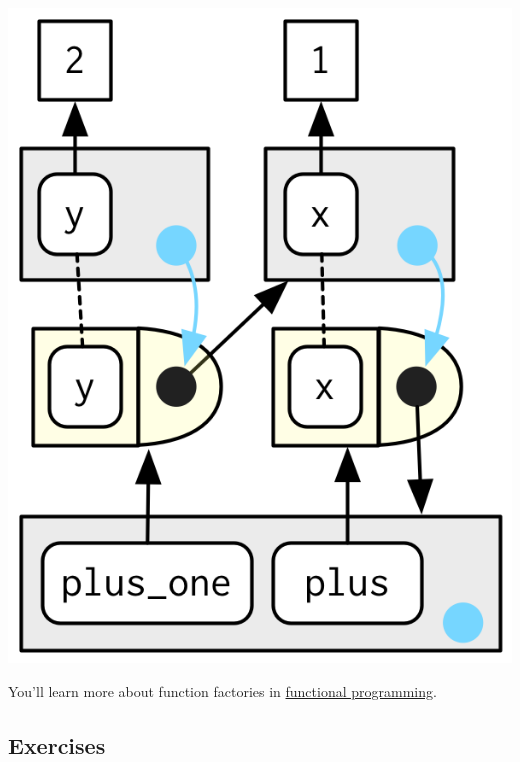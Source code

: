 \documentclass[]{book}
\theoremstyle{definition}
\theoremstyle{definition}
\theoremstyle{definition}
\theoremstyle{remark}
\begin{document}
\begin{center}\includegraphics{diagrams/environments/closure-call} \end{center}

You'll learn more about function factories in
\protect\hyperlink{functional-programming}{functional programming}.

\hypertarget{exercises-8}{%
\subsection{Exercises}\label{exercises-8}}
\end{document}
